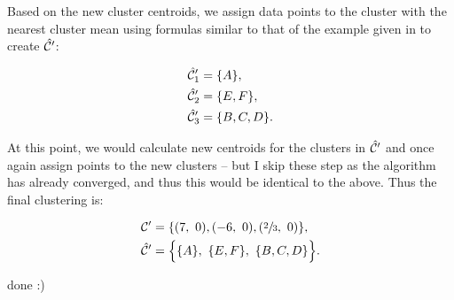 Based on the new cluster centroids, we assign data points to the cluster with
the nearest cluster mean using formulas similar to that of the example given in
 to create $\hat{\mathcal{C}}'$:

\begin{align*}
  \hat{\mathcal{C}}'_1 &= \{A\},\\
  \hat{\mathcal{C}}'_2 &= \{E, F\},\\
  \hat{\mathcal{C}}'_3 &= \{B, C, D\}.
\end{align*}

At this point, we would calculate new centroids for the clusters in $\hat{\mathcal{C}}'$ and
once again assign points to the new clusters -- but I skip these step as the
algorithm has already converged, and thus this would be identical to the above.
Thus the final clustering is:

\begin{align*}
  \mathcal C' &= \{(7,\ 0), (-6,\ 0), (\sfrac{2}{3},\ 0)\},\\
  \hat{\mathcal{C}}' &= \Big\{\{A\},\ \{E, F\},\ \{B, C, D\}\Big\}.
\end{align*}

\sectend

done :)


\iffalse{
   [(7  - 7)**2 + (0  - 0)**2,
    (2  - 7)**2 + (0  - 0)**2,
    (0  - 7)**2 + (-2  - 0)**2,
    (0  - 7)**2 + (2  - 0)**2,
    (-6 - 7)**2 + (-2 - 0)**2,
    (-6 - 7)**2 + (2  - 0)**2]
  }\fi
